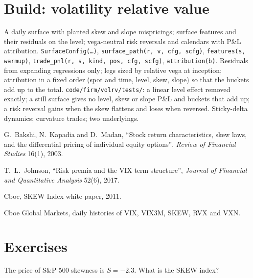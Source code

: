 \section{Build: volatility relative value}\label{bld:s2:skew-and-term-structure-relative-value:volrv}

\begin{build}
 A daily surface with planted skew and slope mispricings; surface features and their residuals on the level; vega-neutral risk
reversals and calendars with P\&L attribution.
 \texttt{SurfaceConfig(\dots)}, \texttt{surface\_path(r, v, cfg, scfg)}, \texttt{features(s, warmup)}, \texttt{trade\_pnl(r, s,
kind, pos, cfg, scfg)}, \texttt{attribution(b)}.
 Residuals from expanding regressions only; legs sized by relative vega at inception; attribution in a fixed order (spot and time,
level, skew, slope) so that the buckets add up to the total.
 \texttt{code/firm/volrv/tests/}: a linear level effect removed exactly; a still surface gives no level, skew or slope
P\&L and buckets that add up; a risk reversal gains when the skew flattens and loses when reversed.
 Sticky-delta dynamics; curvature trades; two underlyings.
\end{build}

\begin{omsources}
\item G.~Bakshi, N.~Kapadia and D.~Madan, ``Stock return characteristics, skew laws, and the differential pricing of individual equity options'',
\emph{Review of Financial Studies} 16(1), 2003.
\item T.~L.~Johnson, ``Risk premia and the VIX term structure'', \emph{Journal of Financial and Quantitative Analysis} 52(6), 2017.
\item Cboe, SKEW Index white paper, 2011.
\item Cboe Global Markets, daily histories of VIX, VIX3M, SKEW, RVX and VXN.
\end{omsources}

\section{Exercises}

\begin{exercise}[$\star$]\label{exo:s2:skew-and-term-structure-relative-value:1}
The price of S\&P 500 skewness is $S = -2.3$. What is the SKEW index?
\end{exercise}

